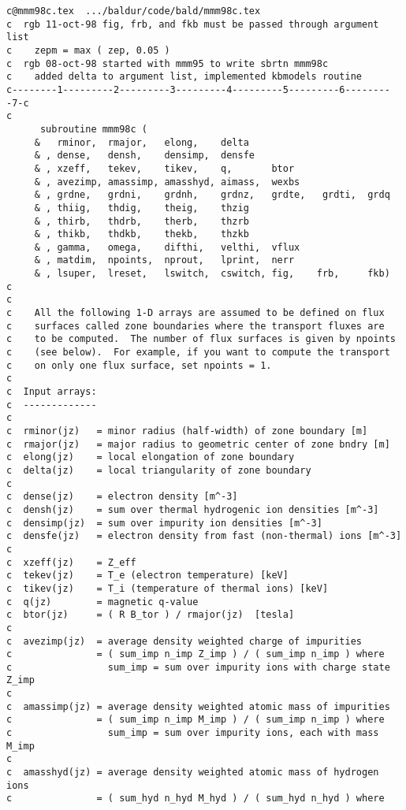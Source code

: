 \begin{verbatim}
c@mmm98c.tex  .../baldur/code/bald/mmm98c.tex
c  rgb 11-oct-98 fig, frb, and fkb must be passed through argument list
c    zepm = max ( zep, 0.05 )
c  rgb 08-oct-98 started with mmm95 to write sbrtn mmm98c
c    added delta to argument list, implemented kbmodels routine
c--------1---------2---------3---------4---------5---------6---------7-c
c
      subroutine mmm98c (
     &   rminor,  rmajor,   elong,    delta
     & , dense,   densh,    densimp,  densfe
     & , xzeff,   tekev,    tikev,    q,       btor
     & , avezimp, amassimp, amasshyd, aimass,  wexbs
     & , grdne,   grdni,    grdnh,    grdnz,   grdte,   grdti,  grdq
     & , thiig,   thdig,    theig,    thzig
     & , thirb,   thdrb,    therb,    thzrb
     & , thikb,   thdkb,    thekb,    thzkb
     & , gamma,   omega,    difthi,   velthi,  vflux
     & , matdim,  npoints,  nprout,   lprint,  nerr
     & , lsuper,  lreset,   lswitch,  cswitch, fig,    frb,     fkb)
c
c
c    All the following 1-D arrays are assumed to be defined on flux
c    surfaces called zone boundaries where the transport fluxes are
c    to be computed.  The number of flux surfaces is given by npoints
c    (see below).  For example, if you want to compute the transport
c    on only one flux surface, set npoints = 1.
c
c  Input arrays:
c  -------------
c
c  rminor(jz)   = minor radius (half-width) of zone boundary [m]
c  rmajor(jz)   = major radius to geometric center of zone bndry [m]
c  elong(jz)    = local elongation of zone boundary
c  delta(jz)    = local triangularity of zone boundary
c
c  dense(jz)    = electron density [m^-3]
c  densh(jz)    = sum over thermal hydrogenic ion densities [m^-3]
c  densimp(jz)  = sum over impurity ion densities [m^-3]
c  densfe(jz)   = electron density from fast (non-thermal) ions [m^-3]
c
c  xzeff(jz)    = Z_eff
c  tekev(jz)    = T_e (electron temperature) [keV] 
c  tikev(jz)    = T_i (temperature of thermal ions) [keV]
c  q(jz)        = magnetic q-value
c  btor(jz)     = ( R B_tor ) / rmajor(jz)  [tesla]
c
c  avezimp(jz)  = average density weighted charge of impurities
c               = ( sum_imp n_imp Z_imp ) / ( sum_imp n_imp ) where
c                 sum_imp = sum over impurity ions with charge state Z_imp
c
c  amassimp(jz) = average density weighted atomic mass of impurities
c               = ( sum_imp n_imp M_imp ) / ( sum_imp n_imp ) where 
c                 sum_imp = sum over impurity ions, each with mass M_imp
c
c  amasshyd(jz) = average density weighted atomic mass of hydrogen ions
c               = ( sum_hyd n_hyd M_hyd ) / ( sum_hyd n_hyd ) where

\end{verbatim}
